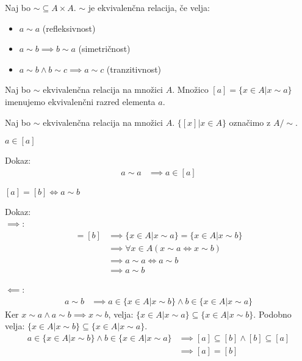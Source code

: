 \begin{definicija}
    Naj bo $\sim \subseteq A \times A$. $\sim$ je ekvivalenčna relacija, če velja:
    \begin{itemize}
        \item $a\sim a$ (refleksivnost)
        \item $a\sim b \implies b\sim a$ (simetričnost)
        \item $a\sim b \wedge b\sim c \implies a\sim c$ (tranzitivnost)
    \end{itemize}
\end{definicija}

\begin{definicija}
    Naj bo $\sim$ ekvivalenčna relacija na množici $A$.
    Množico $[a] = \{x \in A | x \sim a\}$ imenujemo ekvivalenčni razred elementa $a$.
\end{definicija}

\begin{definicija}
    Naj bo $\sim$ ekvivalenčna relacija na množici $A$.
    $\{[x] | x \in A\}$ označimo z $A/\sim$.
\end{definicija}

\begin{trditev}
    $a \in [a]$
\end{trditev}
Dokaz:
\begin{align*}
    a\sim a &\implies a \in [a]
\end{align*}

\begin{trditev}
    $[a] = [b] \iff a\sim b$
\end{trditev}
Dokaz:\\
$\implies$:
\begin{align*}
    [a] = [b] &\implies \{x \in A | x \sim a\} = \{x \in A | x \sim b\} \\
    &\implies \forall x \in A(x \sim a \iff x \sim b) \\
    &\implies a \sim a \iff a \sim b \\
    &\implies a\sim b
\end{align*}

$\impliedby$:
\begin{align*}
    a\sim b &\implies a \in \{x \in A | x \sim b\} \wedge b \in \{x \in A | x \sim a\}
\end{align*}
Ker $x \sim a \wedge a \sim b \implies x \sim b$, velja: $\{x \in A | x \sim a\} \subseteq \{x \in A | x \sim b\}$.
Podobno velja: $\{x \in A | x \sim b\} \subseteq \{x \in A | x \sim a\}$.
\begin{align*}
    a \in \{x \in A | x \sim b\} \wedge b \in \{x \in A | x \sim a\} &\implies [a] \subseteq [b] \wedge [b] \subseteq [a] \\
    &\implies [a] = [b]
\end{align*}


